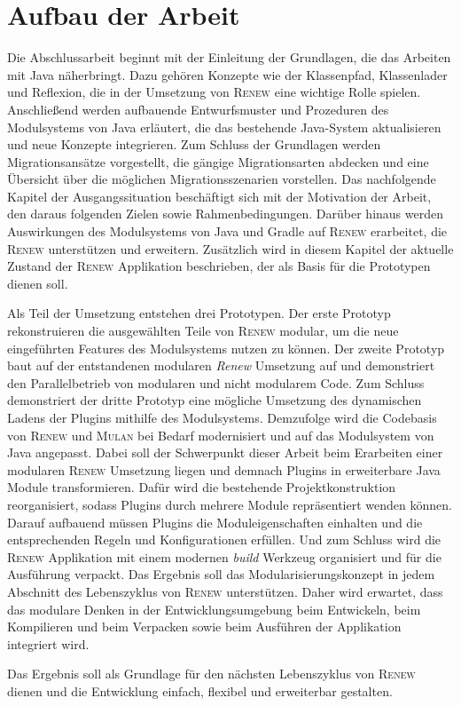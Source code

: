 \section{Aufbau der Arbeit} \label{sec:AdA}
	Die Abschlussarbeit beginnt mit der Einleitung der Grundlagen, die das Arbeiten mit Java näherbringt. Dazu gehören Konzepte wie der Klassenpfad, Klassenlader und Reflexion, die in der Umsetzung von \textsc{Renew} eine wichtige Rolle spielen. Anschließend werden aufbauende Entwurfsmuster und Prozeduren des Modulsystems von Java erläutert, die das bestehende Java-System aktualisieren und neue Konzepte integrieren. Zum Schluss der Grundlagen werden Migrationsansätze vorgestellt, die gängige Migrationsarten abdecken und eine Übersicht über die möglichen Migrationsszenarien vorstellen.\newline 
	Das nachfolgende Kapitel der Ausgangssituation beschäftigt sich mit der Motivation der Arbeit, den daraus folgenden Zielen sowie Rahmenbedingungen. Darüber hinaus werden Auswirkungen des Modulsystems von Java und Gradle auf \textsc{Renew} erarbeitet, die \textsc{Renew} unterstützen und erweitern. Zusätzlich wird in diesem Kapitel der aktuelle Zustand der \textsc{Renew} Applikation beschrieben, der als Basis für die Prototypen dienen soll. \bigbreak 

	Als Teil der Umsetzung entstehen drei Prototypen. Der erste Prototyp rekonstruieren die ausgewählten Teile von \textsc{Renew} modular, um die neue eingeführten Features des Modulsystems nutzen zu können. Der zweite Prototyp baut auf der entstandenen modularen \textit{Renew} Umsetzung auf und demonstriert den Parallelbetrieb von modularen und nicht modularem Code. Zum Schluss demonstriert der dritte Prototyp eine mögliche Umsetzung des dynamischen Ladens der Plugins mithilfe des Modulsystems.\newline
	Demzufolge wird die Codebasis von \textsc{Renew} und \textsc{Mulan} bei Bedarf modernisiert und auf das Modulsystem von Java angepasst. Dabei soll der Schwerpunkt dieser Arbeit beim Erarbeiten einer modularen \textsc{Renew} Umsetzung liegen und demnach Plugins in erweiterbare Java Module transformieren.\newline
	Dafür wird die bestehende Projektkonstruktion reorganisiert, sodass Plugins durch mehrere Module repräsentiert wenden können. Darauf aufbauend müssen Plugins die Moduleigenschaften einhalten und die entsprechenden Regeln und Konfigurationen erfüllen. Und zum Schluss wird die \textsc{Renew} Applikation mit einem modernen \textit{build} Werkzeug organisiert und für die Ausführung verpackt.\newline
	Das Ergebnis soll das Modularisierungskonzept in jedem Abschnitt des Lebenszyklus von \textsc{Renew} unterstützen. Daher wird erwartet, dass das modulare Denken in der Entwicklungsumgebung beim Entwickeln, beim Kompilieren und beim Verpacken sowie beim Ausführen der Applikation integriert wird. \bigbreak

	Das Ergebnis soll als Grundlage für den nächsten Lebenszyklus von \textsc{Renew} dienen und die Entwicklung einfach, flexibel und erweiterbar gestalten. %
